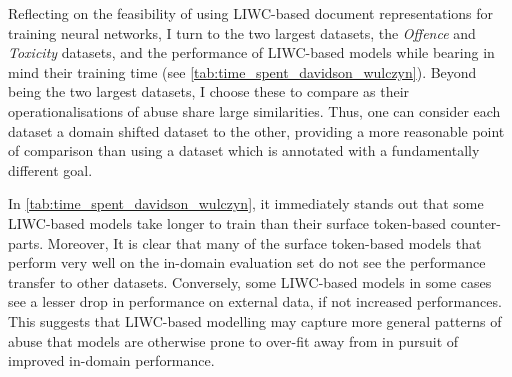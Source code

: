 Reflecting on the feasibility of using LIWC-based document representations for training neural networks, I turn to the two largest datasets, the \textit{Offence} and \textit{Toxicity} datasets, and the performance of LIWC-based models while bearing in mind their training time (see \cref{tab:time_spent_davidson_wulczyn}). 
Beyond being the two largest datasets, I choose these to compare as their operationalisations of abuse share large similarities. 
Thus, one can consider each dataset a domain shifted dataset to the other, providing a more reasonable point of comparison than using a dataset which is annotated with a fundamentally different goal.

In \cref{tab:time_spent_davidson_wulczyn}, it immediately stands out that some LIWC-based models take longer to train than their surface token-based counter-parts.
Moreover, It is clear that many of the surface token-based models that perform very well on the in-domain evaluation set do not see the performance transfer to other datasets.
Conversely, some LIWC-based models in some cases see a lesser drop in performance on external data, if not increased performances.
This suggests that LIWC-based modelling may capture more general patterns of abuse that models are otherwise prone to over-fit away from in pursuit of improved in-domain performance.

